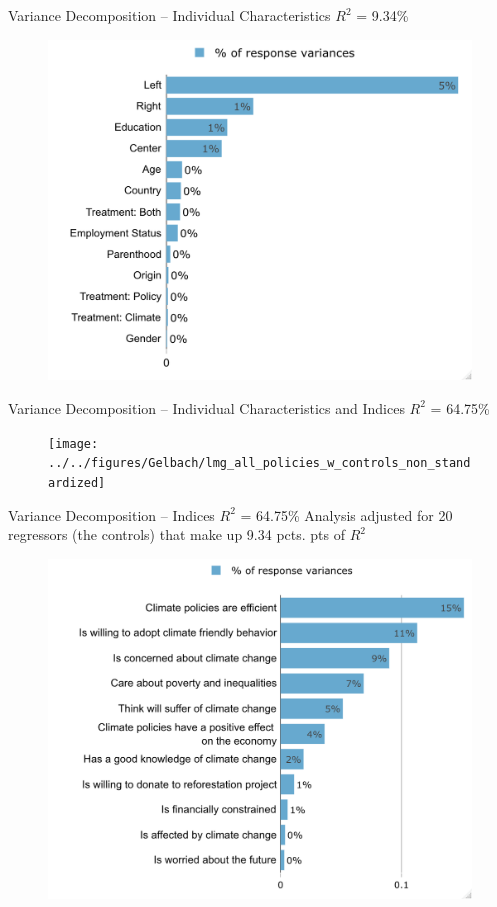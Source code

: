 \begin{frame}{Variance Decomposition -- Individual Characteristics}%
\vspace{-.1cm}
{\footnotesize $R^2$ = 9.34\%}
\begin{figure}[h!]
\includegraphics[width=.64\textwidth]{../../figures/Gelbach/lmg_all_policies_no_indices_non_standardized} \\
\end{figure}
\end{frame}

\begin{frame}{Variance Decomposition -- Individual Characteristics and Indices}%
\vspace{-.1cm}
{\footnotesize $R^2$ = 64.75\%}
\begin{figure}[h!]
\texttt{[image: ../../figures/Gelbach/lmg\_all\_policies\_w\_controls\_non\_standardized]} \\
\end{figure}
\end{frame}

\begin{frame}{Variance Decomposition -- Indices}%
\vspace{-.1cm}
{\footnotesize $R^2$ = 64.75\% Analysis adjusted for 20 regressors (the controls) that make up 9.34 pcts. pts of $R^2$}
\begin{figure}[h!]
\includegraphics[width=.65\textwidth]{../../figures/Gelbach/lmg_all_policies_non_standardized} \\
\end{figure}
\end{frame}

